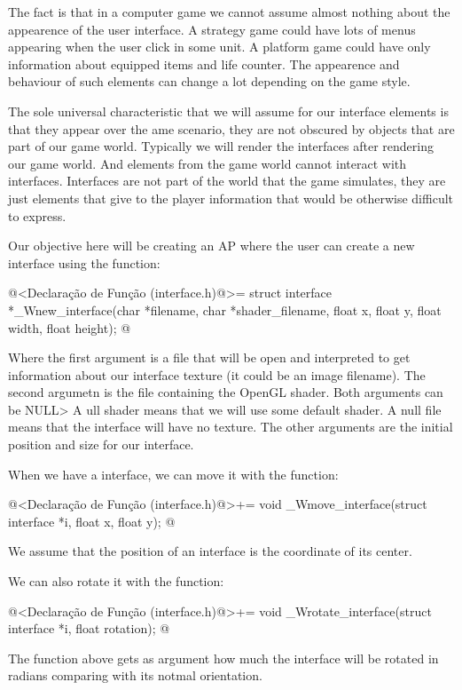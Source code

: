The fact is that in a computer game we cannot assume almost nothing
about the appearence of the user interface. A strategy game could have
lots of menus appearing when the user click in some unit. A platform
game could have only information about equipped items and life
counter. The appearence and behaviour of such elements can change a
lot depending on the game style.

The sole universal characteristic that we will assume for our
interface elements is that they appear over the ame scenario, they are
not obscured by objects that are part of our game world. Typically we
will render the interfaces after rendering our game world. And
elements from the game world cannot interact with
interfaces. Interfaces are not part of the world that the game
simulates, they are just elements that give to the player information
that would be otherwise difficult to express.

Our objective here will be creating an AP where the user can create a
new interface using the function:

\iniciocodigo
@<Declaração de Função (interface.h)@>=
struct interface *_Wnew_interface(char *filename, char *shader_filename,
                                  float x, float y, float width, float height);
@
\fimcodigo

Where the first argument is a file that will be open and interpreted
to get information about our interface texture (it could be an image
filename). The second argumetn is the file containing the OpenGL
shader. Both arguments can be NULL> A ull shader means that we will
use some default shader. A null file means that the interface will
have no texture. The other arguments are the initial position and size
for our interface.

When we have a interface, we can move it with the function:

\iniciocodigo
@<Declaração de Função (interface.h)@>+=
void _Wmove_interface(struct interface *i, float x, float y);
@
\fimcodigo

We assume that the position of an interface is the coordinate of its
center.

We can also rotate it with the function:

\iniciocodigo
@<Declaração de Função (interface.h)@>+=
void _Wrotate_interface(struct interface *i, float rotation);
@
\fimcodigo

The function above gets as argument how much the interface will be
rotated in radians comparing with its notmal orientation.

